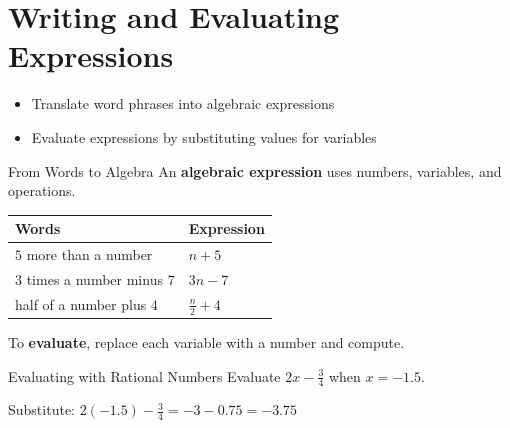 \section{Writing and Evaluating Expressions}

\begin{learningGoals}
\begin{itemize}
    \item Translate word phrases into algebraic expressions
    \item Evaluate expressions by substituting values for variables
\end{itemize}
\end{learningGoals}

\begin{conceptBox}{From Words to Algebra}
An \textbf{algebraic expression} uses numbers, variables, and operations.
\begin{center}
\begin{tabular}{l l}
    \textbf{Words} & \textbf{Expression} \\
    \hline
    $5$ more than a number & $n + 5$ \\
    $3$ times a number minus $7$ & $3n - 7$ \\
    half of a number plus $4$ & $\frac{n}{2} + 4$ \\
\end{tabular}
\end{center}
To \textbf{evaluate}, replace each variable with a number and compute.
\end{conceptBox}

\begin{workedExample}{Evaluating with Rational Numbers}
Evaluate $2x - \frac{3}{4}$ when $x = -1.5$.

Substitute: $2(-1.5) - \frac{3}{4} = -3 - 0.75 = -3.75$
\end{workedExample}


